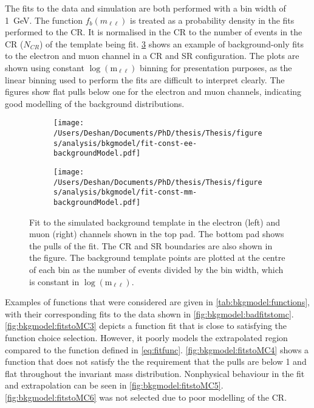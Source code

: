 The fits to the data and simulation are both performed with a bin width of \SI{1}{\giga\electronvolt}. The function $f_b(m_{\ell\ell})$ is treated as a probability density in the fits performed to the CR. It is normalised in the CR to the number of events in the CR ($N_{CR}$) of the template being fit. \cref{fig:bkgmodel:fitstoMC} shows an example of background-only fits to the electron and muon channel in a CR and SR configuration. The plots are shown using constant $\log{(\text{m}_{\ell\ell})}$ binning for presentation purposes, as the linear binning used to perform the fits are difficult to interpret clearly. The figures show flat pulls below one for the electron and muon channels, indicating good modelling of the background distributions. 

\begin{figure}[h!]
    \centering
    \begin{subfigure}[b]{0.49\textwidth}
        \centering
        \texttt{[image: /Users/Deshan/Documents/PhD/thesis/Thesis/figures/analysis/bkgmodel/fit-const-ee-backgroundModel.pdf]}
        \label{fig:fitstoMC1}
    \end{subfigure}
    \begin{subfigure}[b]{0.49\textwidth}
        \centering
        \texttt{[image: /Users/Deshan/Documents/PhD/thesis/Thesis/figures/analysis/bkgmodel/fit-const-mm-backgroundModel.pdf]}
        \label{fig:fitstoMC2}
    \end{subfigure}
    \caption[Fits to the simulated background template in the electron and muon channels]{Fit to the simulated background template in the electron (left) and muon (right) channels shown in the top pad. The bottom pad shows the pulls of the fit. The CR and SR boundaries are also shown in the figure. The background template points are plotted at the centre of each bin as the number of events divided by the bin width, which is constant in $\log{(\text{m}_{\ell\ell})}$.}
    \label{fig:bkgmodel:fitstoMC}
\end{figure}

Examples of functions that were considered are given in \cref{tab:bkgmodel:functions}, with their corresponding fits to the data shown in \cref{fig:bkgmodel:badfitstomc}. \cref{fig:bkgmodel:fitstoMC3} depicts a function fit that is close to satisfying the function choice selection. However, it poorly models the extrapolated region compared to the function defined in \cref{eq:fitfunc}. \cref{fig:bkgmodel:fitstoMC4} shows a function that does not satisfy the the requirement that the pulls are below 1 and flat throughout the invariant mass distribution. Nonphysical behaviour in the fit and  extrapolation can be seen in \cref{fig:bkgmodel:fitstoMC5}. \cref{fig:bkgmodel:fitstoMC6} was not selected due to poor modelling of the CR. 

